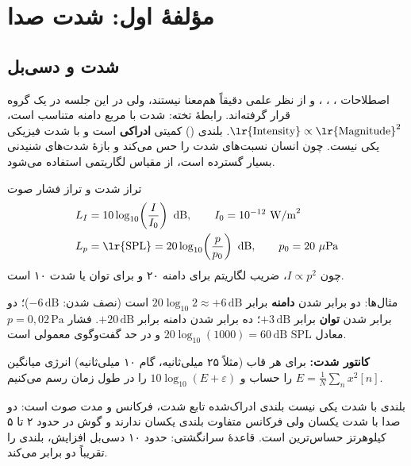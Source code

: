 \section{مؤلفهٔ اول: شدت صدا}

\subsection{شدت و دسی‌بل}
اصطلاحات ، ، ،  و  از نظر علمی دقیقاً هم‌معنا نیستند، ولی در این جلسه در یک گروه قرار گرفته‌اند. رابطهٔ تخته: شدت با مربع دامنه متناسب است، $\text{\lr{Intensity}}\propto\text{\lr{Magnitude}}^{2}$. بلندی () کمیتی \textbf{ادراکی} است و با شدت فیزیکی یکی نیست. چون انسان نسبت‌های شدت را حس می‌کند و بازهٔ شدت‌های شنیدنی بسیار گسترده است، از مقیاس لگاریتمی  استفاده می‌شود.

\begin{definitionbox}{تراز شدت و تراز فشار صوت}
\begin{align*}
L_I &= 10\log_{10}\!\left(\frac{I}{I_0}\right)\ \text{dB}, \qquad I_0=10^{-12}\ \text{W/m}^2 \\
L_p &= \text{\lr{SPL}} = 20\log_{10}\!\left(\frac{p}{p_0}\right)\ \text{dB}, \qquad p_0=20\ \mu\text{Pa}
\end{align*}
چون $I\propto p^2$، ضریب لگاریتم برای دامنه ۲۰ و برای توان یا شدت ۱۰ است.
\end{definitionbox}

مثال‌ها: دو برابر شدن \textbf{دامنه} برابر $20\log_{10}2\approx+6\,\text{dB}$ است (نصف شدن: $-6\,\text{dB}$)؛ دو برابر شدن \textbf{توان} برابر $+3\,\text{dB}$؛ ده برابر شدن دامنه برابر $+20\,\text{dB}$. فشار $p=0{,}02\,\text{Pa}$ معادل $20\log_{10}(1000)=60\,\text{dB SPL}$ و در حد گفت‌وگوی معمولی است.


\textbf{کانتور شدت:} برای هر قاب (مثلاً ۲۵ میلی‌ثانیه، گام ۱۰ میلی‌ثانیه) انرژی میانگین $E=\frac1N\sum_n x^2[n]$ را حساب و $10\log_{10}(E+\varepsilon)$ را در طول زمان رسم می‌کنیم.

\begin{correctionbox}{بلندی با شدت یکی نیست}
بلندی ادراک‌شده تابع شدت، فرکانس و مدت صوت است: دو صدا با شدت یکسان ولی فرکانس متفاوت بلندی یکسان ندارند و گوش در حدود ۲ تا ۵ کیلوهرتز حساس‌ترین است. قاعدهٔ سرانگشتی: حدود ۱۰ دسی‌بل افزایش، بلندی را تقریباً دو برابر می‌کند.
\end{correctionbox}

